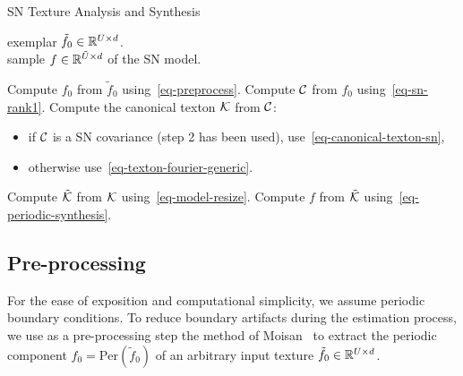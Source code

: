\begin{algorithm}[ht!]
\caption{SN Texture Analysis and Synthesis}
\label{alg-gaussian-texture-modeling}
\Require exemplar $\tilde f_0 \in \mathbb{R}^{U \times d}$. \\
\Ensure sample $f \in \mathbb{R}^{\tilde {U} \times d}$ of the SN model.
\begin{enumerate}
	 Compute $f_0$ from $\tilde f_0$ using~\eqref{eq-preprocess}.
	 Compute $\mathcal{C}$ from $f_0$ using~\eqref{eq-sn-rank1}.
	 Compute the canonical texton $\mathcal{K}$ from $\mathcal{C}$:
		\begin{itemize}
			\item if $\mathcal{C}$ is a SN covariance (step 2 has been used),
				use~\eqref{eq-canonical-texton-sn},
			\item otherwise use~\eqref{eq-texton-fourier-generic}.
		\end{itemize}
	 Compute $\tilde {\mathcal{K}}$ from $\mathcal{K}$ using~\eqref{eq-model-resize}.
	 Compute $f$ from $\tilde{\mathcal{K}}$ using~\eqref{eq-periodic-synthesis}.
\end{enumerate}
\end{algorithm}



\subsection{Pre-processing}
\label{subsec-preprocess-sn}

For the ease of exposition and computational simplicity, we assume periodic boundary conditions. To reduce boundary artifacts during the estimation process, we use as a pre-processing step the method of Moisan~\cite{Moisan11} to extract the periodic component $f_0 = \textrm{Per}(\tilde f_0)$ of an arbitrary input texture $\tilde f_0 \in \mathbb{R}^{U \times d}$.

